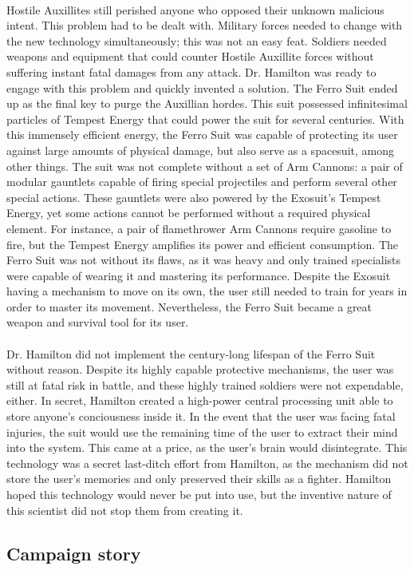 \documentclass[../Main.tex]{subfiles}
\begin{document}
\paragraph{}
Hostile Auxillites still perished anyone who opposed their unknown malicious intent. This problem had to be dealt with. Military forces needed to change with the new technology simultaneously; this was not an easy feat. Soldiers needed weapons and equipment that could counter Hostile Auxillite forces without suffering instant fatal damages from any attack. Dr. Hamilton was ready to engage with this problem and quickly invented a solution. The Ferro Suit ended up as the final key to purge the Auxillian hordes. This suit possessed infinitesimal particles of Tempest Energy that could power the suit for several centuries. With this immensely efficient energy, the Ferro Suit was capable of protecting its user against large amounts of physical damage, but also serve as a spacesuit, among other things. The suit was not complete without a set of Arm Cannons: a pair of modular gauntlets capable of firing special projectiles and perform several other special actions. These gauntlets were also powered by the Exosuit's Tempest Energy, yet some actions cannot be performed without a required physical element. For instance, a pair of flamethrower Arm Cannons require gasoline to fire, but the Tempest Energy amplifies its power and efficient consumption. The Ferro Suit was not without its flaws, as it was heavy and only trained specialists were capable of wearing it and mastering its performance. Despite the Exosuit having a mechanism to move on its own, the user still needed to train for years in order to master its movement. Nevertheless, the Ferro Suit became a great weapon and survival tool for its user. 

\paragraph{}
Dr. Hamilton did not implement the century-long lifespan of the Ferro Suit without reason. Despite its highly capable protective mechanisms, the user was still at fatal risk in battle, and these highly trained soldiers were not expendable, either. In secret, Hamilton created a high-power central processing unit able to store anyone's conciousness inside it. In the event that the user was facing fatal injuries, the suit would use the remaining time of the user to extract their mind into the system. This came at a price, as the user's brain would disintegrate. This technology was a secret last-ditch effort from Hamilton, as the mechanism did not store the user's memories and only preserved their skills as a fighter. Hamilton hoped this technology would never be put into use, but the inventive nature of this scientist did not stop them from creating it.

\subsection{Campaign story}
\end{document}
